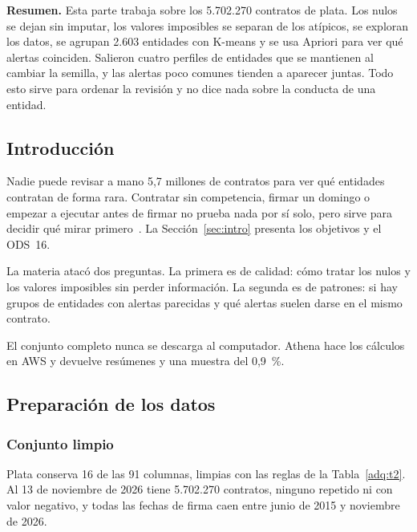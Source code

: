 \noindent\textbf{Resumen.} Esta parte trabaja sobre los 5.702.270 contratos de plata. Los nulos se dejan sin imputar, los valores imposibles se separan de los atípicos, se exploran los datos, se agrupan 2.603 entidades con K-means y se usa Apriori para ver qué alertas coinciden. Salieron cuatro perfiles de entidades que se mantienen al cambiar la semilla, y las alertas poco comunes tienden a aparecer juntas. Todo esto sirve para ordenar la revisión y no dice nada sobre la conducta de una entidad.

\subsection{Introducción}
Nadie puede revisar a mano 5,7 millones de contratos para ver qué entidades contratan de forma rara. Contratar sin competencia, firmar un domingo o empezar a ejecutar antes de firmar no prueba nada por sí solo, pero sirve para decidir qué mirar primero~\cite{ocp2016,fazekas2020}. La Sección~\ref{sec:intro} presenta los objetivos y el ODS~16.

La materia atacó dos preguntas. La primera es de calidad: cómo tratar los nulos y los valores imposibles sin perder información. La segunda es de patrones: si hay grupos de entidades con alertas parecidas y qué alertas suelen darse en el mismo contrato.

El conjunto completo nunca se descarga al computador. Athena hace los cálculos en AWS y devuelve resúmenes y una muestra del 0,9~\%.

\subsection{Preparación de los datos}
\subsubsection{Conjunto limpio}
\label{mineria:sec:limpieza}
Plata conserva 16 de las 91 columnas, limpias con las reglas de la Tabla~\ref{adq:t2}. Al 13 de noviembre de 2026 tiene 5.702.270 contratos, ninguno repetido ni con valor negativo, y todas las fechas de firma caen entre junio de 2015 y noviembre de 2026.

